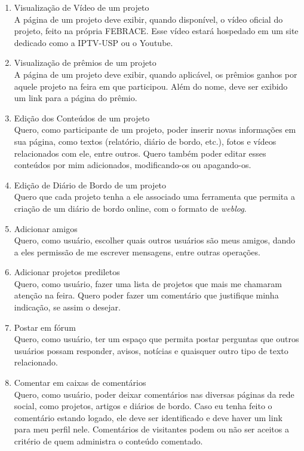 \documentclass[a4paper,12pt,font=plain,header=plain]{abnt}
\begin{document}
\begin{enumerate}
	 \item Visualização de Vídeo de um projeto \\
		A página de um projeto deve exibir, quando disponível, o vídeo oficial do projeto, feito na própria FEBRACE. Esse vídeo estará hospedado em um site dedicado como a IPTV-USP ou o Youtube.
	 \item Visualização de prêmios de um projeto \\
		A página de um projeto deve exibir, quando aplicável, os prêmios ganhos por aquele projeto na feira em que participou. Além do nome, deve ser exibido um link para a página do prêmio.
	 \item Edição dos Conteúdos de um projeto \\
		Quero, como participante de um projeto, poder inserir novas informações em sua página, como textos (relatório, diário de bordo, etc.), fotos e vídeos relacionados com ele, entre outros. Quero também poder editar esses conteúdos por mim adicionados, modificando-os ou apagando-os.
	 \item Edição de Diário de Bordo de um projeto \\
		Quero que cada projeto tenha a ele associado uma ferramenta que permita a criação de um diário de bordo online, com o formato de \textit{weblog}.
	 \item Adicionar amigos \\
		Quero, como usuário, escolher quais outros usuários são meus amigos, dando a eles permissão de me escrever mensagens, entre outras operações.
	 \item Adicionar projetos prediletos \\
		Quero, como usuário, fazer uma lista de projetos que mais me chamaram atenção na feira. Quero poder fazer um comentário que justifique minha indicação, se assim o desejar.
	 \item Postar em fórum \\
		Quero, como usuário, ter um espaço que permita postar perguntas que outros usuários possam responder, avisos, notícias e quaisquer outro tipo de texto relacionado.
	 \item Comentar em caixas de comentários \\
		Quero, como usuário, poder deixar comentários nas diversas páginas da rede social, como projetos, artigos e diários de bordo. Caso eu tenha feito o comentário estando logado, ele deve ser identificado e deve haver um link para meu perfil nele. Comentários de visitantes podem ou não ser aceitos a critério de quem administra o conteúdo comentado.

\end{enumerate}
\end{document}
